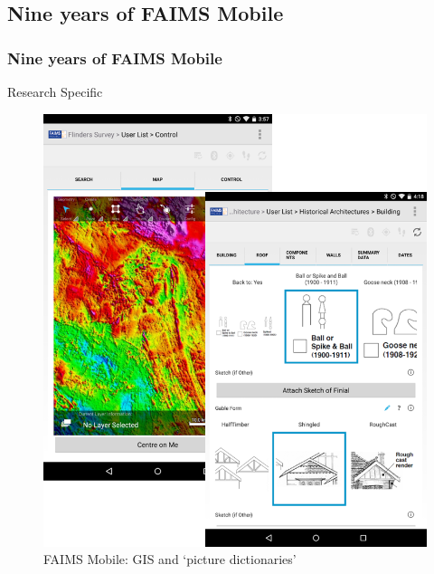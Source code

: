 \documentclass[
	aspectratio=169, %
	12pt, %
	t, %
]{beamer}
\begin{document}
\begin{refsegment}

\section{Nine years of FAIMS Mobile}

\begin{sectionframe} %
	\frametitle{Nine years of FAIMS Mobile}


\end{sectionframe}



\begin{frame}{Research Specific}
 \begin{figure}[H]
    \centering
    \vspace{-0.5cm}
        \includegraphics[height=.75\textheight]{figures/FAIMS-screenshots.png}
        \caption{FAIMS Mobile: GIS and `picture dictionaries'}
        \label{fig:FAIMS-mobile-screenshots}
 \end{figure}
\end{frame}


\end{refsegment}
\end{document}
